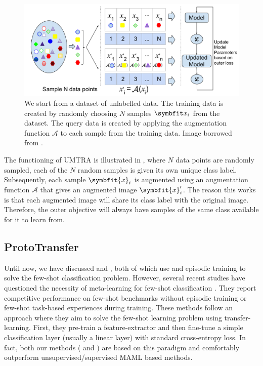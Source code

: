 \begin{figure}[ht]
    \centering
    \includegraphics[width=\linewidth]{chapters/assets/fsl/UnsupervisedMetaTraining3.pdf}
    \caption{We start from a dataset of unlabelled data. The training data is created by randomly choosing $N$ samples $\bfitx_i$ from the dataset. The query data is created by applying the augmentation function $\mathcal{A}$ to each sample from the training data. Image borrowed from \parencite{Khodadadeh2018UnsupervisedClassification}.}
    \label{fig:umtra}
\end{figure}

The functioning of UMTRA is illustrated in , where $N$ data points are randomly sampled, each of the $N$ random samples is given its own unique class label. Subsequently, each sample $\symbfit{x}_i$ is augmented using an augmentation function $\mathcal{A}$ that gives an augmented image $\symbfit{x}_i^\prime$. 
The reason this works is that each augmented image will share its class label with the original image. Therefore, the outer objective will always have samples of the same class available for it to learn from. 

\subsection{ProtoTransfer}\label{ssec:prototransfer}

Until now, we have discussed  and , both of which use  and episodic training to solve the few-shot classification problem.
However, several recent studies have questioned the necessity of meta-learning for few-shot classification \parencite{goodemballneed2020, Medina2020Self-SupervisedClassification, dhillon2019baseline, ziko2020laplacian, boudiaf2020information,chen2021self}.
They report competitive performance on few-shot benchmarks without episodic training or few-shot task-based experiences during training. 
These methods follow an approach where they aim to solve the few-shot learning problem using transfer-learning. First, they pre-train a feature-extractor and then fine-tune a simple classification layer (usually a linear layer) with standard cross-entropy loss.
In fact, both our methods (\ccclr{} and \samptr{}) are based on this paradigm and comfortably outperform unsupervised/supervised MAML based methods.

